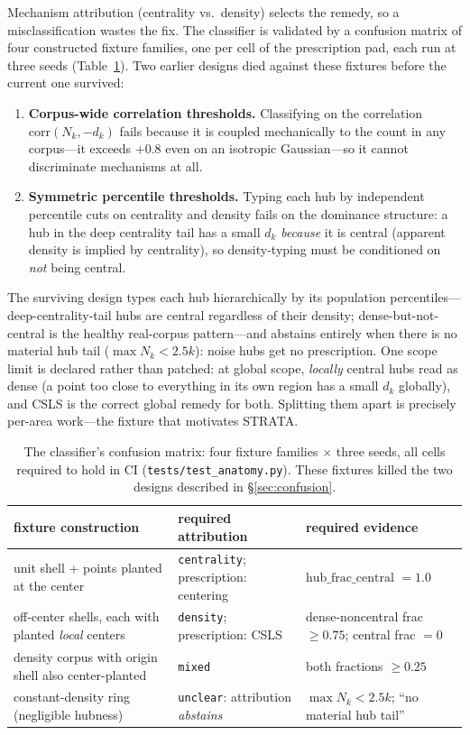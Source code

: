 \documentclass[sigconf, nonacm]{acmart}
\begin{document}
Mechanism attribution (centrality vs.\ density) selects the remedy, so a
misclassification wastes the fix. The classifier is validated by a
confusion matrix of four constructed fixture families, one per cell of the
prescription pad, each run at three seeds (Table~\ref{tab:confusion}).
Two earlier designs died against these fixtures before the current one
survived:

\begin{enumerate}
\item \textbf{Corpus-wide correlation thresholds.} Classifying on the
correlation $\mathrm{corr}(N_k, -d_k)$ fails because it is coupled
mechanically to the count in any corpus---it exceeds $+0.8$ even on an
isotropic Gaussian---so it cannot discriminate mechanisms at all.
\item \textbf{Symmetric percentile thresholds.} Typing each hub by
independent percentile cuts on centrality and density fails on the
dominance structure: a hub in the deep centrality tail has a small $d_k$
\emph{because} it is central (apparent density is implied by centrality),
so density-typing must be conditioned on \emph{not} being central.
\end{enumerate}

The surviving design types each hub hierarchically by its population
percentiles---deep-centrality-tail hubs are central regardless of their
density; dense-but-not-central is the healthy real-corpus pattern---and
abstains entirely when there is no material hub tail
($\max N_k < 2.5k$): noise hubs get no prescription. One scope limit is
declared rather than patched: at global scope, \emph{locally} central hubs
read as dense (a point too close to everything in its own region has a
small $d_k$ globally), and CSLS is the correct global remedy for both.
Splitting them apart is precisely per-area work---the fixture that
motivates STRATA.

\begin{table}[t]
\caption{The classifier's confusion matrix: four fixture families
$\times$ three seeds, all cells required to hold in CI
(\texttt{tests/test\_anatomy.py}). These fixtures killed the two designs
described in \S\ref{sec:confusion}.}
\label{tab:confusion}
\small
\begin{tabular}{@{}p{2.35cm}p{2.9cm}p{2.5cm}@{}}
\toprule
fixture construction & required attribution & required evidence \\
\midrule
unit shell + points planted at the center &
\texttt{centrality}; prescription: centering &
$\mathrm{hub\_frac\_central}$ $= 1.0$ \\[2pt]
off-center shells, each with planted \emph{local} centers &
\texttt{density}; prescription: CSLS &
dense-noncentral frac $\ge 0.75$; central frac $= 0$ \\[2pt]
density corpus with origin shell also center-planted &
\texttt{mixed} &
both fractions $\ge 0.25$ \\[2pt]
constant-density ring (negligible hubness) &
\texttt{unclear}: attribution \emph{abstains} &
$\max N_k < 2.5k$; ``no material hub tail'' \\
\bottomrule
\end{tabular}
\end{table}
\end{document}
